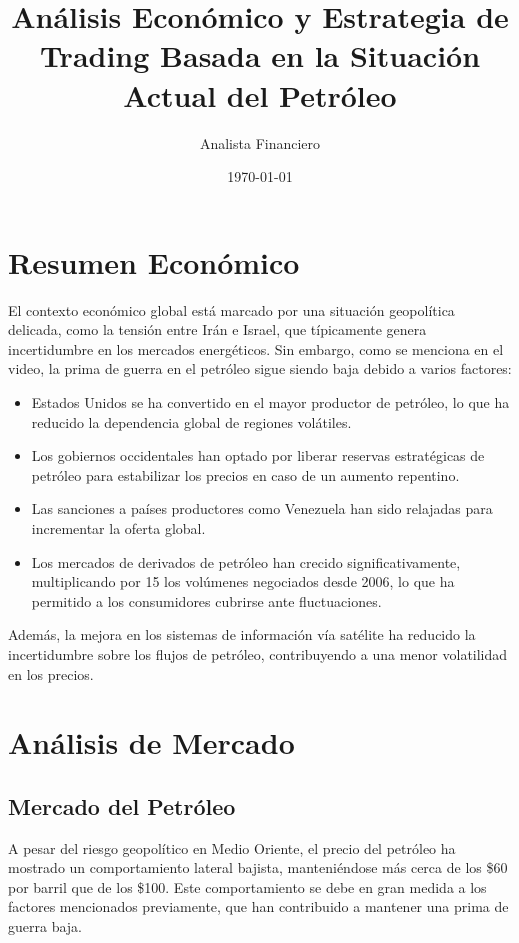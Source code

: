 \documentclass{article}
\title{Análisis Económico y Estrategia de Trading Basada en la Situación Actual del Petróleo}
\author{Analista Financiero}
\date{\today}
\begin{document}
\maketitle

\tableofcontents

\section{Resumen Económico}
El contexto económico global está marcado por una situación geopolítica delicada, como la tensión entre Irán e Israel, que típicamente genera incertidumbre en los mercados energéticos. Sin embargo, como se menciona en el video, la prima de guerra en el petróleo sigue siendo baja debido a varios factores:
\begin{itemize}
    \item Estados Unidos se ha convertido en el mayor productor de petróleo, lo que ha reducido la dependencia global de regiones volátiles.
    \item Los gobiernos occidentales han optado por liberar reservas estratégicas de petróleo para estabilizar los precios en caso de un aumento repentino.
    \item Las sanciones a países productores como Venezuela han sido relajadas para incrementar la oferta global.
    \item Los mercados de derivados de petróleo han crecido significativamente, multiplicando por 15 los volúmenes negociados desde 2006, lo que ha permitido a los consumidores cubrirse ante fluctuaciones.
\end{itemize}
Además, la mejora en los sistemas de información vía satélite ha reducido la incertidumbre sobre los flujos de petróleo, contribuyendo a una menor volatilidad en los precios.

\section{Análisis de Mercado}
\subsection{Mercado del Petróleo}
A pesar del riesgo geopolítico en Medio Oriente, el precio del petróleo ha mostrado un comportamiento lateral bajista, manteniéndose más cerca de los \$60 por barril que de los \$100. Este comportamiento se debe en gran medida a los factores mencionados previamente, que han contribuido a mantener una prima de guerra baja.
\end{document}
